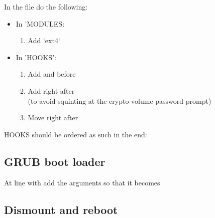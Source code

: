 \begin{blocksection}
    In the file do the following:
    \begin{itemize}[noitemsep,topsep=0pt,leftmargin=*]
        \item In 'MODULES:
        \begin{enumerate}
            \item Add `ext4`
        \end{enumerate}
        \item In 'HOOKS':
        \begin{enumerate}
            \item Add  and  before 
            \item Add  right after \\
                  (to avoid squinting at the crypto volume password prompt)
            \item Move  right after 
        \end{enumerate}
    \end{itemize}
    HOOKS should be ordered as such in the end:\\
\end{blocksection}
        

\subsection{GRUB boot loader}

\begin{blocksection}
    At line with  add the arguments so that it becomes\\
\end{blocksection}

\subsection{Dismount and reboot}


